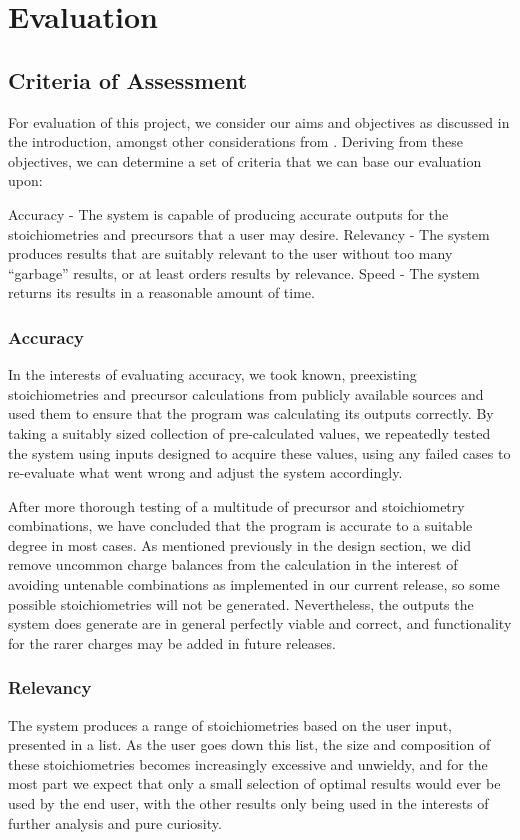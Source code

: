 \chapter{Evaluation}
\label{ch:evaluation}
\section{Criteria of Assessment}
For evaluation of this project, we consider our aims and objectives as discussed in the introduction, amongst other considerations from . Deriving from these objectives, we can determine a set of criteria that we can base our evaluation upon:

Accuracy - The system is capable of producing accurate outputs for the stoichiometries and precursors that a user may desire.
Relevancy - The system produces results that are suitably relevant to the user without too many “garbage” results, or at least orders results by relevance.
Speed - The system returns its results in a reasonable amount of time.

\subsection{Accuracy}
In the interests of evaluating accuracy, we took known, preexisting stoichiometries and precursor calculations from publicly available sources and used them to ensure that the program was calculating its outputs correctly. By taking a suitably sized collection of pre-calculated values, we repeatedly tested the system using inputs designed to acquire these values, using any failed cases to re-evaluate what went wrong and adjust the system accordingly. 

After more thorough testing of a multitude of precursor and stoichiometry combinations, we have concluded that the program is accurate to a suitable degree in most cases. As mentioned previously in the design section, we did remove uncommon charge balances from the calculation in the interest of avoiding untenable combinations as implemented in our current release, so some possible stoichiometries will not be generated. Nevertheless, the outputs the system does generate are in general perfectly viable and correct, and functionality for the rarer charges may be added in future releases.

\subsection{Relevancy}
The system produces a range of stoichiometries based on the user input, presented in a list. As the user goes down this list, the size and composition of these stoichiometries becomes increasingly excessive and unwieldy, and for the most part we expect that only a small selection of optimal results would ever be used by the end user, with the other results only being used in the interests of further analysis and pure curiosity.

